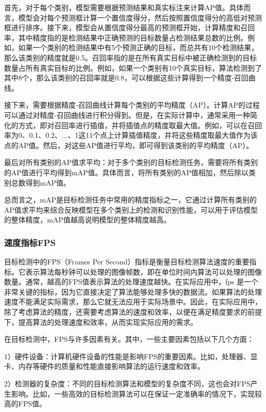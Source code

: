 \documentclass{ctexart}
\numberwithin{equation}{section}%
\numberwithin{figure}{section}%
\numberwithin{table}{section}%
\begin{document}
	首先，对于每个类别，模型需要根据预测结果和真实标注来计算AP值。具体而言，模型会对每个预测框计算一个置信度得分，然后按照置信度得分的高低对预测框进行排序。接下来，模型会从置信度得分最高的预测框开始，计算精度和召回率，其中精度指的是检测结果中正确预测的目标数量占检测结果总数的比例。例如，如果一个类别的检测结果中有5个预测正确的目标，而总共有10个检测结果，那么该类别的精度就是0.5。召回率指的是在所有真实目标中被正确检测到的目标数量占所有真实目标的比例。例如，如果一个类别有10个真实目标，算法检测到了其中8个，那么该类别的召回率就是0.8，可以根据这些计算得到一个精度-召回曲线。
	
	接下来，需要根据精度-召回曲线计算每个类别的平均精度（AP）。计算AP的过程可以通过对精度-召回曲线进行积分得到。但是，在实际计算中，通常采用一种简化的方式，即对召回率进行插值，并将插值点的精度取最大值。例如，可以在召回率为0、0.1、0.2、...、1这11个点上计算插值精度，并将这些精度取最大值作为该点的AP值。然后，对这些AP值进行平均，即可得到该类别的平均精度（AP）。
	
	最后对所有类别的AP值求平均：对于多个类别的目标检测任务，需要将所有类别的AP值进行平均得到mAP值。具体而言，将所有类别的AP值相加，然后除以类别总数得到mAP值。
	
	总而言之，mAP是目标检测任务中常用的精度指标之一，它通过计算所有类别的AP值求平均来综合反映模型在多个类别上的检测和识别性能，可以用于评估模型的整体精度，mAP值越高说明模型的整体精度越高。
	
	\subsubsection{速度指标FPS}
	目标检测中的FPS（Frames Per Second）指标是衡量目标检测算法速度的重要指标。它表示算法每秒钟可以处理的图像帧数，即在单位时间内算法可以处理的图像数量。通常，越高的FPS值表示算法的处理速度越快。在实际应用中，fps 是一个非常关键的指标，因为它直接决定了算法能够处理多快的数据流。如果算法的处理速度不能满足实际需求，那么它就无法应用于实际场景中。因此，在实际应用中，除了考虑算法的精度，还需要考虑算法的速度和效率，以便在满足精度要求的前提下，提高算法的处理速度和效率，从而实现实际应用的需求。
	
	在目标检测中，FPS与许多因素有关。其中，一些主要因素包括以下几个方面：
	
	1）硬件设备：计算机硬件设备的性能是影响FPS的重要因素。比如，处理器、显卡、内存等硬件的质量和性能直接影响算法的运行速度和效率。
	
	2）检测器的复杂度：不同的目标检测算法和模型的复杂度不同，这也会对FPS产生影响。比如，一些高效的目标检测算法可以在保证一定准确率的情况下，实现较高的FPS值。
	
\end{document}
